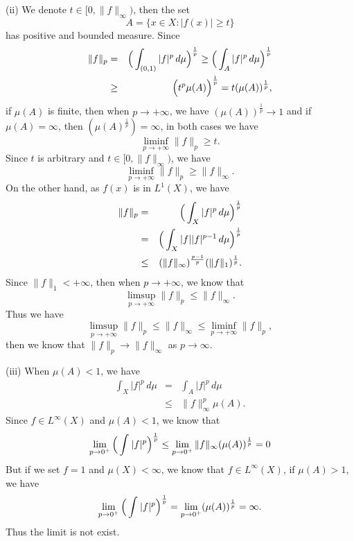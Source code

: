 \documentclass[12pt,a4paper]{ctexart}
\begin{document}
(ii) We denote $t \in [0, \|f \|_{\infty})$, then the set 
\begin{equation*}
   A = \{x \in X: |f(x)| \geq t \}
\end{equation*}
has positive and bounded measure. Since
\begin{eqnarray*}
\|f\|_{p} & = & \Big{(} \int_{(0, 1)}^{} |f|^{p} \, d \mu \Big{)}^{\frac{1}{p}} \geq \Big{(} \int_{A}^{} |f|^{p} \, d \mu \Big{)}^{\frac{1}{p}} \\
& \geq & \Big{(} t^{p} \mu(A)\Big{)}^{\frac{1}{p}} = t (\mu(A))^{\frac{1}{p}},
\end{eqnarray*}
if $\mu(A)$ is finite, then when $p \to + \infty$, we have $(\mu(A))^{\frac{1}{p}} \to 1$ and if $\mu(A) = \infty$, then $(\mu(A)^{\frac{1}{p}}) = \infty$, in both cases we have
\begin{equation*}
   \liminf_{p \to + \infty} \|f\|_{p} \geq t.
\end{equation*}
Since $t$ is arbitrary and $t \in [0, \|f \|_{\infty})$, we have
\begin{equation*}
   \liminf_{p \to + \infty} \|f\|_{p} \geq \|f \|_{\infty} .
\end{equation*}
On the other hand, as $f(x)$ is in $L^{1}(X)$, we have
\begin{eqnarray*}
    \|f\|_{p} &=& \Big{(} \int_{X}^{} |f|^{p} \, d \mu \Big{)}^{\frac{1}{p}} \\
    &=& \Big{(} \int_{X}^{} |f| |f|^{p-1} \, d \mu \Big{)}^{\frac{1}{p}} \\
    & \leq &  (\|f\|_{\infty})^{\frac{p-1}{p}} (\|f\|_{1})^{\frac{1}{p}} .
\end{eqnarray*}
Since $\|f\|_{1} < + \infty$, then when $p \to + \infty$, we know that
\begin{equation*}
   \limsup_{p \to + \infty} \|f\|_{p} \leq \|f \|_{\infty} .
\end{equation*}
Thus we have
\begin{equation*}
   \limsup_{p \to + \infty} \|f\|_{p} \leq \|f \|_{\infty} \leq \liminf_{p \to + \infty} \|f\|_{p},
\end{equation*}
then we know that $\|f \|_{p} \rightarrow \|f \|_{\infty}$ as $p \rightarrow \infty$.


(iii) When $\mu(A)<1$, we have
\begin{eqnarray*}
    \int_{X}^{} |f|^{p} \, d \mu &=& \int_{A}^{} |f|^{p} \, d \mu \\
    & \leq & \|f\|_{\infty}^{p} \mu(A).
\end{eqnarray*}
Since $f \in L^{\infty}(X)$ and $\mu(A) < 1$, we know that
\begin{equation*}
    \lim_{p \to 0^{+}} \Big{(} \int_{}^{} |f|^{p} \Big{)}^{\frac{1}{p}} \leq \lim_{p \to 0^{+}} \|f\|_{\infty} (\mu(A))^{\frac{1}{p}} = 0
\end{equation*}
But if we set $f = 1$ and $\mu(X) < \infty$, we know that $f \in L^{\infty}(X)$, if $\mu(A) > 1$, we have
\begin{equation*}
    \lim_{p \to 0^{+}} \Big{(} \int_{}^{} |f|^{p} \Big{)}^{\frac{1}{p}} = \lim_{p \to 0^{+}} (\mu(A))^{\frac{1}{p}} = \infty.
\end{equation*}
Thus the limit is not exist.
\end{document}
